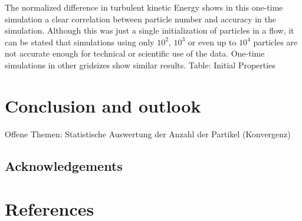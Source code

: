\documentclass[11pt,a4paper,openany,oneside,parskip=half*]{article}
\begin{document}
The normalized difference in turbulent kinetic Energy shows in this one-time simulation a clear correlation between particle number and accuracy in the simulation. Although this was just a single initialization of particles in a flow, it can be stated that simulations using only $10^2$, $10^3$ or even up to $10^4$ particles are not accurate enough for technical or scientific use of the data. One-time simulations in other gridsizes show similar results.
\newline
Table: Initial Properties
\pagebreak
\section{Conclusion and outlook}
Offene Themen: Statistische Auswertung der Anzahl der Partikel (Konvergenz)
\subsection*{Acknowledgements}
\pagebreak
\section{References}
\nocite{*} %
\pagebreak
\end{document}
